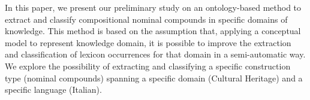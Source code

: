 In this paper, we present our preliminary study on an ontology-based method to extract and classify compositional nominal compounds in specific domains of knowledge. This method is based on the assumption that, applying a conceptual model to represent knowledge domain, it is possible to improve the extraction and classification of lexicon occurrences for that domain in a semi-automatic way. We explore the possibility of extracting and classifying a specific construction type (nominal compounds) spanning a specific domain (Cultural Heritage) and a specific language (Italian).
